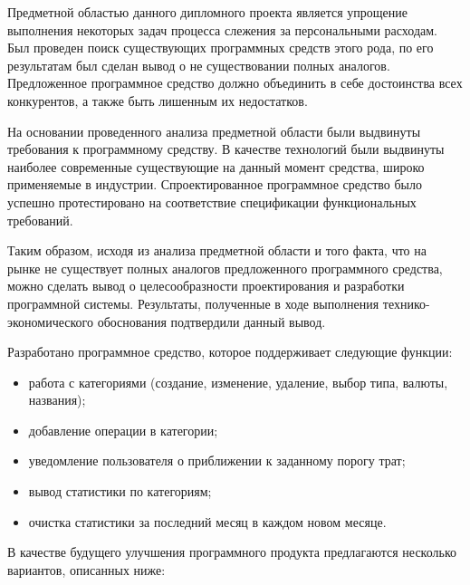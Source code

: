 
Предметной областью данного дипломного проекта является упрощение выполнения некоторых задач процесса слежения за персональными расходам. Был проведен поиск существующих программных средств этого рода, по его результатам был сделан вывод о не существовании полных аналогов. Предложенное программное средство должно объединить в себе достоинства всех конкурентов, а также быть лишенным их недостатков.

На основании проведенного анализа предметной области были выдвинуты требования к программному средству. В качестве технологий были выдвинуты наиболее современные существующие на данный момент средства, широко применяемые в индустрии. Спроектированное программное средство было успешно протестировано на соответствие спецификации функциональных требований. 

Таким образом, исходя из анализа предметной области и того факта, что на рынке не существует полных аналогов предложенного программного средства, можно сделать вывод о целесообразности проектирования и разработки программной системы. Результаты, полученные в ходе выполнения технико-экономического обоснования подтвердили данный вывод.

Разработано программное средство, которое поддерживает следующие функции:
\begin{itemize}
	\item работа с категориями (создание, изменение, удаление, выбор типа, валюты, названия);
	\item добавление операции в категории;
	\item уведомление пользователя о приближении к заданному порогу трат;
	\item вывод статистики по категориям;
	\item очистка статистики за последний месяц в каждом новом месяце.
\end{itemize}

В качестве будущего улучшения программного продукта предлагаются несколько вариантов, описанных ниже:

